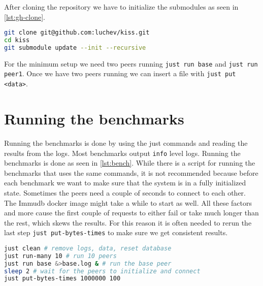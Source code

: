 After cloning the repository we have to initialize the submodules as seen in \autoref{lst:gh-clone}.
\begin{lstlisting}[language=bash, caption={Cloning and setting up the repository}, label={lst:gh-clone}]
git clone git@github.com:luchev/kiss.git
cd kiss
git submodule update --init --recursive
\end{lstlisting}

For the minimum setup we need two peers running \texttt{just run base} and \texttt{just run peer1}.
Once we have two peers running we can insert a file with \texttt{just put <data>}.

\section{Running the benchmarks}

Running the benchmarks is done by using the just commands and reading the results from the logs.
Most benchmarks output \texttt{info} level logs.
Running the benchmarks is done as seen in \autoref{lst:bench}.
While there is a script for running the benchmarks that uses the same commands, 
it is not recommended because before each benchmark we want to make sure that
the system is in a fully initialized state.
Sometimes the peers need a couple of seconds to connect to each other.
The Immudb docker image might take a while to start as well.
All these factors and more cause the first couple of requests to either fail or take
much longer than the rest, which skews the results.
For this reason it is often needed to rerun the last step \texttt{just put-bytes-times}
to make sure we get consistent results.

\begin{lstlisting}[language=bash, caption={Running the benchmarks}, label={lst:bench}]
just clean # remove logs, data, reset database
just run-many 10 # run 10 peers
just run base &>base.log & # run the base peer
sleep 2 # wait for the peers to initialize and connect
just put-bytes-times 1000000 100
\end{lstlisting}
